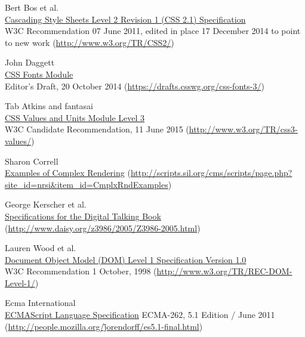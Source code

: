\begin{thebibliography}{25}

Bert Bos et al. \\
  \href{http://www.w3.org/TR/CSS2/}{Cascading Style Sheets Level 2 Revision 1 (CSS 2.1) Specification} \\
W3C Recommendation 07 June 2011, edited in place 17 December 2014 to point to new work (\href{http://www.w3.org/TR/CSS2/}{http://www.w3.org/TR/CSS2/})

John Daggett \\
\href{https://drafts.csswg.org/css-fonts-3/}{CSS Fonts Module} \\
Editor’s Draft, 20 October 2014 (\href{https://drafts.csswg.org/css-fonts-3/}{https://drafts.csswg.org/css-fonts-3/})

Tab Atkins and fantasai \\
\href{http://www.w3.org/TR/css3-values}{CSS Values and Units Module Level 3} \\
W3C Candidate Recommendation, 11 June 2015 (\href{http://www.w3.org/TR/css3-values/}{http://www.w3.org/TR/css3-values/})

Sharon Correll \\
\href{http://scripts.sil.org/cms/scripts/page.php?site\_id=nrsi\&item\_id=CmplxRndExamples}{Examples of Complex Rendering}
(\href{http://scripts.sil.org/cms/scripts/page.php?site\_id=nrsi\&item\_id=CmplxRndExamples}{http://scripts.sil.org/cms/scripts/page.php?site\_id=nrsi\&item\_id=CmplxRndExamples})

George Kerscher et al. \\
\href{http://www.daisy.org/z3986/2005/Z3986-2005.html}{Specifications for the Digital Talking Book}  (\href{http://www.daisy.org/z3986/2005/Z3986-2005.html}{http://www.daisy.org/z3986/2005/Z3986-2005.html})

  Lauren Wood et al. \\
  \href{http://www.w3.org/TR/REC-DOM-Level-1/}{Document Object Model (DOM) Level 1 Specification Version 1.0} \\
W3C Recommendation 1 October, 1998 (\href{http://www.w3.org/TR/REC-DOM-Level-1/}{http://www.w3.org/TR/REC-DOM-Level-1/})

Ecma International \\
\href{http://people.mozilla.org/~jorendorff/es5.1-final.html}{ECMAScript Language Specification}
ECMA-262, 5.1 Edition / June 2011 (\href{http://people.mozilla.org/\~jorendorff/es5.1-final.html}{http://people.mozilla.org/\~jorendorff/es5.1-final.html})


\end{thebibliography}
